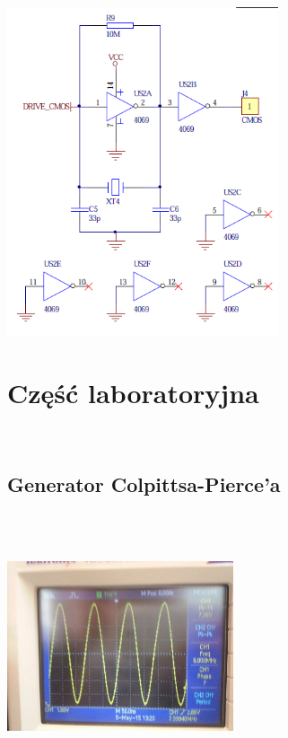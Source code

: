 \documentclass[a4paper,12pt]{article}
\begin{document}
\begin{center}
  \includegraphics[width=0.6\textwidth]{u3}
\end{center}
\section{Część laboratoryjna}\
\subsection{Generator Colpittsa-Pierce'a }
\\ \\
\begin{center}
  \includegraphics[width=0.5\textwidth]{o3}
\end{center}
\end{document}
